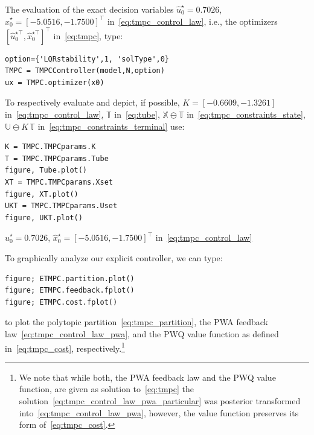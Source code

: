 \documentclass[letterpaper, 10 pt, conference]{ieeeconf}
\begin{document}
The evaluation of the exact decision variables $\hat{u}_{0}^{\star} = 0.7026$, $\hat{x}_{0}^{\star} = [-5.0516, -1.7500]^{\top}$ in~\eqref{eq:tmpc_control_law}, i.e., the optimizers $\left[ \hat{u}_{0}^{\star\top}, \hat{x}_{0}^{\star\top} \right]^{\top}$ in~\eqref{eq:tmpc}, type:
\begin{lstlisting}[style=Matlab-editor]
option={'LQRstability',1, 'solType',0}
TMPC = TMPCController(model,N,option)
ux = TMPC.optimizer(x0)
\end{lstlisting}
To respectively evaluate and depict, if possible, $K = [-0.6609, -1.3261]$ in~\eqref{eq:tmpc_control_law}, $\mathbb{T}$ in~\eqref{eq:tube}, $\mathbb{X} \ominus \mathbb{T}$ in~\eqref{eq:tmpc_constraints_state}, $\mathbb{U} \ominus K \, \mathbb{T}$ in~\eqref{eq:tmpc_constraints_terminal} use:
\begin{lstlisting}[style=Matlab-editor]
K = TMPC.TMPCparams.K
T = TMPC.TMPCparams.Tube
figure, Tube.plot()
XT = TMPC.TMPCparams.Xset
figure, XT.plot()
UKT = TMPC.TMPCparams.Uset
figure, UKT.plot()
\end{lstlisting}

$\hat{u}_{0}^{\star} = 0.7026$, $\hat{x}_{0}^{\star} = [-5.0516, -1.7500]^{\top}$ in~\eqref{eq:tmpc_control_law}


To graphically analyze our explicit controller, we can type:
\begin{lstlisting}[style=Matlab-editor]
figure; ETMPC.partition.plot()
figure; ETMPC.feedback.fplot()
figure; ETMPC.cost.fplot()
\end{lstlisting}
to plot the polytopic partition~\eqref{eq:tmpc_partition}, the PWA feedback law~\eqref{eq:tmpc_control_law_pwa}, and the PWQ value function as defined in~\eqref{eq:tmpc_cost}, respectively.\footnote{We note that while both, the PWA feedback law and the PWQ value function, are given as solution to~\eqref{eq:tmpc} the solution~\eqref{eq:tmpc_control_law_pwa_particular} was posterior transformed into~\eqref{eq:tmpc_control_law_pwa}, however, the value function preserves its form of~\eqref{eq:tmpc_cost}.}
\end{document}
